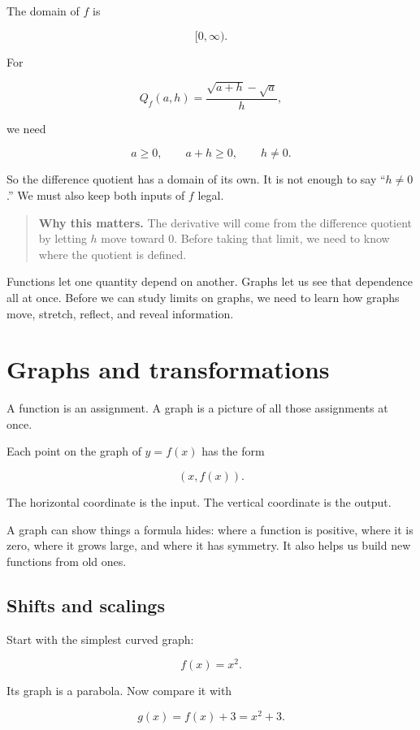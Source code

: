 The domain of \(f\) is

\[
[0,\infty).
\]

For

\[
Q_f(a,h)=\frac{\sqrt{a+h}-\sqrt a}{h},
\]

we need

\[
a\ge 0,\qquad a+h\ge 0,\qquad h\neq 0.
\]

So the difference quotient has a domain of its own. It is not enough to say ``\(h\neq 0\).'' We must also keep both inputs of \(f\) legal.

\begin{quote}
\textbf{Why this matters.}
The derivative will come from the difference quotient by letting \(h\) move toward \(0\). Before taking that limit, we need to know where the quotient is defined.
\end{quote}

Functions let one quantity depend on another. Graphs let us see that dependence all at once. Before we can study limits on graphs, we need to learn how graphs move, stretch, reflect, and reveal information.

\section{Graphs and transformations}
\label{sec:graphs-transformations}

A function is an assignment. A graph is a picture of all those assignments at once.

Each point on the graph of \(y=f(x)\) has the form

\[
(x,f(x)).
\]

The horizontal coordinate is the input. The vertical coordinate is the output.

A graph can show things a formula hides: where a function is positive, where it is zero, where it grows large, and where it has symmetry. It also helps us build new functions from old ones.

\subsection{Shifts and scalings}
\label{subsec:shifts-and-scalings}

Start with the simplest curved graph:

\[
f(x)=x^2.
\]

Its graph is a parabola. Now compare it with

\[
g(x)=f(x)+3=x^2+3.
\]

